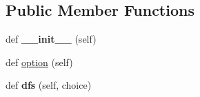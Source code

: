 \subsection*{Public Member Functions}
\begin{DoxyCompactItemize}
\item 
def {\bfseries \+\_\+\+\_\+init\+\_\+\+\_\+} (self)\hypertarget{class_web___crawler_1_1_web___crawler_aa3903156d6d4e8c904c28b14258c239a}{}\label{class_web___crawler_1_1_web___crawler_aa3903156d6d4e8c904c28b14258c239a}

\item 
def \hyperlink{class_web___crawler_1_1_web___crawler_a03625f256ac5f2ce950dd39d8b7e3670}{option} (self)
\item 
def {\bfseries dfs} (self, choice)\hypertarget{class_web___crawler_1_1_web___crawler_a6f9bc2bc5c43de7f05cd068b4af6ba73}{}\label{class_web___crawler_1_1_web___crawler_a6f9bc2bc5c43de7f05cd068b4af6ba73}


\end{DoxyCompactItemize}
